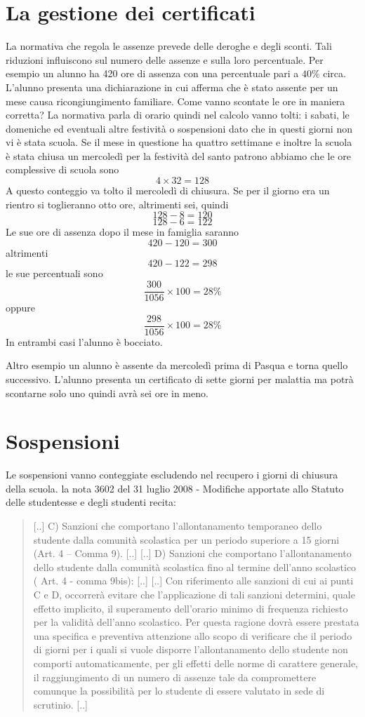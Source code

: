 \documentclass{article}
\begin{document}
\section*{La gestione dei certificati}
La normativa che regola le assenze prevede delle deroghe e degli sconti. Tali riduzioni influiscono sul numero delle assenze e sulla loro percentuale. 
Per esempio un alunno ha 420 ore di assenza con una percentuale pari a $40\%$ circa. L'alunno presenta una dichiarazione in cui afferma che è stato assente per un mese causa ricongiungimento familiare. Come vanno scontate le ore in maniera corretta? 
La normativa parla di orario quindi nel calcolo vanno tolti: i sabati, le domeniche ed eventuali altre festività o sospensioni dato che in questi giorni non vi è stata scuola. Se il mese in questione ha quattro settimane e inoltre la scuola è stata chiusa un mercoledì per la festività del santo patrono abbiamo che le ore complessive di scuola sono \[4\times 32=128\]
A questo conteggio va tolto il mercoledì di chiusura. Se per il giorno era un rientro si toglieranno otto ore, altrimenti sei, quindi 
\[128-8=120\]
\[128-6=122\]
Le sue ore di assenza dopo il mese in famiglia saranno
\[420-120=300\]
altrimenti
\[420-122=298\]
le sue percentuali
sono \[\dfrac{300}{1056}\times 100=28\%\]  oppure \[\dfrac{298}{1056}\times 100=28\%\] In entrambi casi l'alunno è bocciato.

Altro esempio un alunno è assente da mercoledì prima di Pasqua e torna quello successivo. L'alunno presenta un certificato di sette giorni per malattia ma potrà scontarne solo uno quindi avrà sei ore in meno.
\section*{Sospensioni}
Le sospensioni  vanno conteggiate escludendo nel recupero i giorni di chiusura della scuola. la nota 3602 del 31 luglio 2008 - Modifiche apportate allo Statuto delle studentesse e degli studenti recita:
\begin{quotation}
	[..]
	C) Sanzioni che comportano l’allontanamento temporaneo dello studente dalla comunità scolastica per un periodo  superiore a 15 giorni (Art. 4 – Comma 9).
	[..]
	[..]
	D) Sanzioni che comportano l’allontanamento  dello studente dalla comunità scolastica fino al termine dell'anno scolastico ( Art. 4 - comma 9bis):
	[..]
	[..]
	Con riferimento alle sanzioni di cui ai punti C e D, occorrerà evitare che l’applicazione di tali sanzioni determini, quale effetto implicito, il superamento dell'orario minimo di frequenza richiesto per la validità dell'anno scolastico. Per questa ragione dovrà essere prestata una specifica e preventiva attenzione allo scopo di verificare che il periodo di giorni per i quali si vuole disporre l’allontanamento dello studente non comporti automaticamente, per gli effetti delle norme di carattere generale, il raggiungimento di un numero di assenze tale da compromettere comunque la possibilità per lo studente di essere valutato in sede di scrutinio.
	[..]
\end{quotation}
\nocite{*}
\printbibliography
\end{document}

